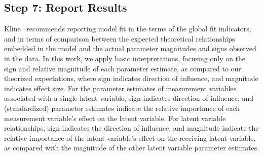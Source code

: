\subsection{Step 7: Report Results}
Kline~\cite{kline2015principles} recommends reporting model fit in the terms of the global fit indicators, and in terms of comparison between the expected theoretical relationships embedded in the model and the actual parameter magnitudes and signs observed in the data. In this work, we apply basic interpretations, focusing only on the sign and relative magnitude of each parameter estimate, as compared to our theorized expectations, where sign indicates direction of influence, and magnitude indicates effect size. For the parameter estimates of measurement variables associated with a single latent variable, sign indicates direction of influence, and (standardized) parameter estimates indicate the relative importance of each measurement variable's effect on the latent variable. For latent variable relationships, sign indicates the direction of influence, and magnitude indicate the relative importance of the latent variable's effect on the receiving latent variable, as compared with the magnitude of the other latent variable parameter estimates.